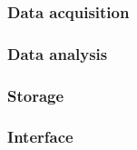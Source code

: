 \subsubsection{Data acquisition}
\subsubsection{Data analysis}
\subsubsection{Storage}
\subsubsection{Interface}
